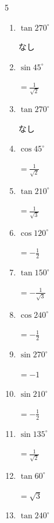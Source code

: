 \begin{multicols}{5}
\begin{enumerate}
\columnbreak %

\resetques

  \item $\displaystyle \tan{270^\circ}$

        $\displaystyle なし$

  \item $\displaystyle \sin{45^\circ}$

        $\displaystyle =\frac{1}{\sqrt{2}}$

  \item $\displaystyle \tan{270^\circ}$

        $\displaystyle なし$

  \item $\displaystyle \cos{45^\circ}$

        $\displaystyle =\frac{1}{\sqrt{2}}$

  \item $\displaystyle \tan{210^\circ}$

        $\displaystyle =\frac{1}{\sqrt{3}}$

  \item $\displaystyle \cos{120^\circ}$

        $\displaystyle =-\frac{1}{2}$

  \item $\displaystyle \tan{150^\circ}$

        $\displaystyle =-\frac{1}{\sqrt{3}}$

  \item $\displaystyle \cos{240^\circ}$

        $\displaystyle =-\frac{1}{2}$

  \item $\displaystyle \sin{270^\circ}$

        $\displaystyle =-1$

  \item $\displaystyle \sin{210^\circ}$

        $\displaystyle =-\frac{1}{2}$

  \item $\displaystyle \sin{135^\circ}$

        $\displaystyle =\frac{1}{\sqrt{2}}$

  \item $\displaystyle \tan{60^\circ}$

        $\displaystyle =\sqrt{3}$

  \item $\displaystyle \tan{240^\circ}$


\end{enumerate}
\end{multicols}
